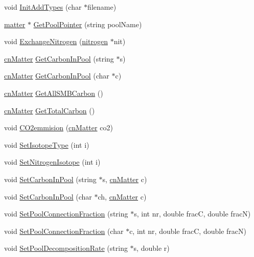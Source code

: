 \begin{DoxyCompactItemize}
void \hyperlink{classorganic_matter_acf0fae55b68d6d0845d20fcfdd1638b4}{InitAddTypes} (char $\ast$filename)
\item 
\hyperlink{classmatter}{matter} $\ast$ \hyperlink{classorganic_matter_a1e25c88f7c63626ad89ee88973310171}{GetPoolPointer} (string poolName)
\item 
void \hyperlink{classorganic_matter_a43dda8881019ddfe13875940264505cb}{ExchangeNitrogen} (\hyperlink{classnitrogen}{nitrogen} $\ast$nit)
\item 
\hyperlink{classcn_matter}{cnMatter} \hyperlink{classorganic_matter_aaa2442182b092b20547ea3cc422000de}{GetCarbonInPool} (string $\ast$s)
\item 
\hyperlink{classcn_matter}{cnMatter} \hyperlink{classorganic_matter_a61c294edd237e70d07a33678a470f1dc}{GetCarbonInPool} (char $\ast$c)
\item 
\hyperlink{classcn_matter}{cnMatter} \hyperlink{classorganic_matter_aa166dfa7baf76d5cf11baf2b65e9baf4}{GetAllSMBCarbon} ()
\item 
\hyperlink{classcn_matter}{cnMatter} \hyperlink{classorganic_matter_ae19830c90a2f172ede6a81e778c98d32}{GetTotalCarbon} ()
\item 
void \hyperlink{classorganic_matter_af8da4028cf9d47ffff40198537947652}{CO2emmision} (\hyperlink{classcn_matter}{cnMatter} co2)
\item 
void \hyperlink{classorganic_matter_a471fa39b7f79ccae2ae020e5b9c1329f}{SetIsotopeType} (int i)
\item 
void \hyperlink{classorganic_matter_ad1d3b959079c019aee2164c8e32791ed}{SetNitrogenIsotope} (int i)
\item 
void \hyperlink{classorganic_matter_a78a87a55fb5d119b774c4f93d7994493}{SetCarbonInPool} (string $\ast$s, \hyperlink{classcn_matter}{cnMatter} c)
\item 
void \hyperlink{classorganic_matter_ad28011da0fd7454eaa1f9aed545bfdc6}{SetCarbonInPool} (char $\ast$ch, \hyperlink{classcn_matter}{cnMatter} c)
\item 
void \hyperlink{classorganic_matter_a0e64612ab5367f164ae298a50fde55c9}{SetPoolConnectionFraction} (string $\ast$s, int nr, double fracC, double fracN)
\item 
void \hyperlink{classorganic_matter_ad5c435634528672b927fbf347143afbe}{SetPoolConnectionFraction} (char $\ast$c, int nr, double fracC, double fracN)
\item 
void \hyperlink{classorganic_matter_ad3f7859dfff063a1c3f44054a7d4ecf5}{SetPoolDecompositionRate} (string $\ast$s, double r)
\item 

\end{DoxyCompactItemize}

